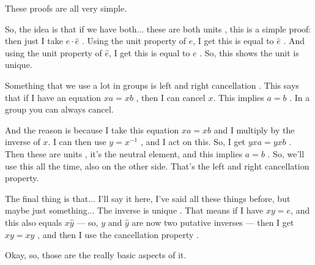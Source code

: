 \begin{speech}[00:46:04 - 00:48:17]
These proofs are all very simple.

So, the idea is that if we have both... these are both units , this is a simple proof: then just I take $e \cdot \hat{e}$ . Using the unit property of $e$, I get this is equal to $\hat{e}$ . And using the unit property of $\hat{e}$, I get this is equal to $e$ . So, this shows the unit is unique.

Something that we use a lot in groups is left and right cancellation . This says that if I have an equation $xa = xb$ , then I can cancel $x$. This implies $a = b$ . In a group you can always cancel.

And the reason is because I take this equation $xa = xb$ and I multiply by the inverse of $x$. I can then use $y = x^{-1}$ , and I act on this. So, I get $yxa = yxb$ . Then these are units , it's the neutral element, and this implies $a = b$ . So, we'll use this all the time, also on the other side. That's the left and right cancellation property.

The final thing is that... I'll say it here, I've said all these things before, but maybe just something... The inverse is unique . That means if I have $xy = e$, and this also equals $x\hat{y}$  --- so, $y$ and $\hat{y}$ are now two putative inverses --- then I get $xy = x\hat{y}$ , and then I use the cancellation property .

Okay, so, those are the really basic aspects of it.
\end{speech}

